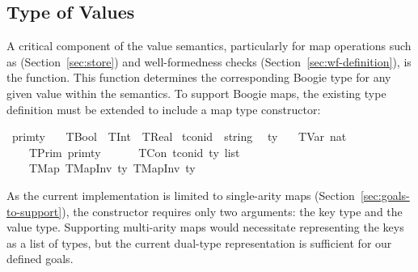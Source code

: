\subsection{Type of Values}
\label{sec:type-of-values}
A critical component of the value semantics, particularly for map operations such as  (Section~\ref{sec:store}) and well-formedness checks (Section~\ref{sec:wf-definition}),
is the  function.
This function determines the corresponding Boogie type for any given value within the semantics.
To support Boogie maps, the existing type definition must be extended to include a map type constructor:



\begin{isabellebody}\isanewline
{}\isamarkupfalse%
\ prim{\isacharunderscore}{\kern0pt}ty\ \isanewline
\ {\isacharequal}{\kern0pt}\ TBool\ {\isacharbar}{\kern0pt}\ TInt\ {\isacharbar}{\kern0pt}\ TReal\isanewline
\isanewline
{}\isamarkupfalse%
\ tcon{\isacharunderscore}{\kern0pt}id\ {\isacharequal}{\kern0pt}\ string\ \isanewline
\isanewline
{}\isamarkupfalse%
\ ty\isanewline
\ \ {\isacharequal}{\kern0pt}\ TVar\ nat\ {\isacharbar}{\kern0pt}\ \isanewline
\ \ \ \ TPrim\ prim{\isacharunderscore}{\kern0pt}ty\ {\isacharbar}{\kern0pt}\ \isanewline
\ \ \ \ TCon\ tcon{\isacharunderscore}{\kern0pt}id\ {\isachardoublequoteopen}ty\ list{\isachardoublequoteclose}\ \ {\isacharbar}{\kern0pt}\isanewline
\ \ \ \ TMap\ {\isacharparenleft}{\kern0pt}TMapInv{}{\isacharcolon}{\kern0pt}\ ty{\isacharparenright}{\kern0pt}\ {\isacharparenleft}{\kern0pt}TMapInv{}{\isacharcolon}{\kern0pt}\ ty{\isacharparenright}{\kern0pt}
\end{isabellebody}


As the current implementation is limited to single-arity maps
(Section~\ref{sec:goals-to-support}), the  constructor requires only two arguments:
the key type and the value type.
Supporting multi-arity maps would necessitate representing the keys as a list of types,
but the current dual-type representation is sufficient for our defined goals.

